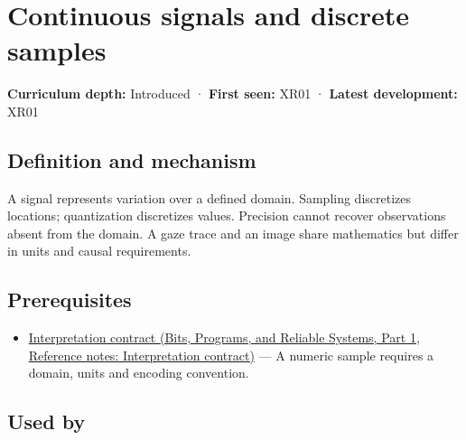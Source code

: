 \hypertarget{appendix-1077ea8fc737}{}\label{referencestart:appendix-1077ea8fc737}
\section{Continuous signals and discrete samples}\label{appendix-1077ea8fc737-continuous-signals-and-discrete-samples}

\hypertarget{appendix-1077ea8fc737-continuous-signals-and-discrete-samples}{}

\textbf{Curriculum depth:} Introduced · \textbf{First seen:} XR01 · \textbf{Latest development:} XR01

\begin{allmightroledefinition}

\subsection{Definition and mechanism}\label{appendix-1077ea8fc737-definition-and-mechanism}

\hypertarget{appendix-1077ea8fc737-definition-and-mechanism}{}

A signal represents variation over a defined domain. Sampling discretizes locations; quantization discretizes values. Precision cannot recover observations absent from the domain. A gaze trace and an image share mathematics but differ in units and causal requirements.

\end{allmightroledefinition}

\subsection{Prerequisites}\label{appendix-1077ea8fc737-prerequisites}

\hypertarget{appendix-1077ea8fc737-prerequisites}{}

\begin{itemize}
\tightlist
\item
  \href{../01-Bits-Programs-and-Reliable-Systems-P01/main.pdf\#appendix-f414bd4ed05c}{Interpretation contract (Bits, Programs, and Reliable Systems, Part 1, Reference notes: Interpretation contract)} --- A numeric sample requires a domain, units and encoding convention.
\end{itemize}

\subsection{Used by}\label{appendix-1077ea8fc737-used-by}

